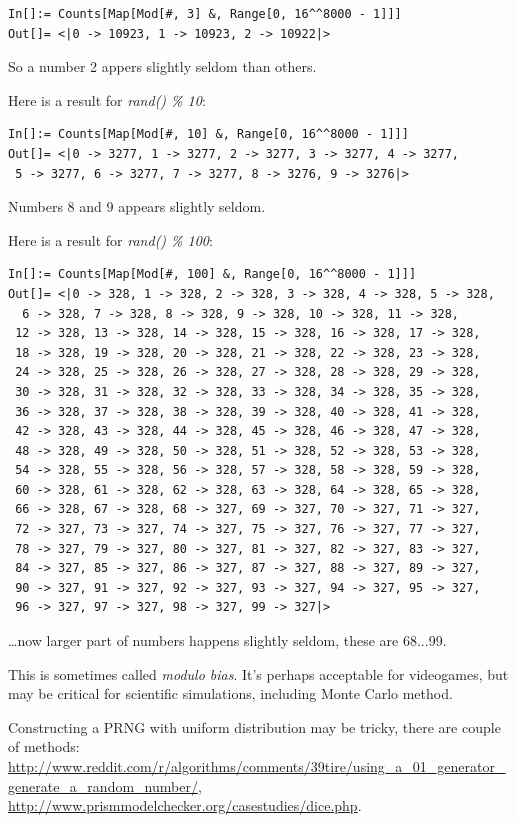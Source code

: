 \begin{lstlisting}
In[]:= Counts[Map[Mod[#, 3] &, Range[0, 16^^8000 - 1]]]
Out[]= <|0 -> 10923, 1 -> 10923, 2 -> 10922|>
\end{lstlisting}

So a number 2 appers slightly seldom than others.

Here is a result for \textit{rand() \% 10}:

\begin{lstlisting}
In[]:= Counts[Map[Mod[#, 10] &, Range[0, 16^^8000 - 1]]]
Out[]= <|0 -> 3277, 1 -> 3277, 2 -> 3277, 3 -> 3277, 4 -> 3277,
 5 -> 3277, 6 -> 3277, 7 -> 3277, 8 -> 3276, 9 -> 3276|>
\end{lstlisting}

Numbers 8 and 9 appears slightly seldom.

Here is a result for \textit{rand() \% 100}:

\begin{lstlisting}
In[]:= Counts[Map[Mod[#, 100] &, Range[0, 16^^8000 - 1]]]
Out[]= <|0 -> 328, 1 -> 328, 2 -> 328, 3 -> 328, 4 -> 328, 5 -> 328,
  6 -> 328, 7 -> 328, 8 -> 328, 9 -> 328, 10 -> 328, 11 -> 328,
 12 -> 328, 13 -> 328, 14 -> 328, 15 -> 328, 16 -> 328, 17 -> 328,
 18 -> 328, 19 -> 328, 20 -> 328, 21 -> 328, 22 -> 328, 23 -> 328,
 24 -> 328, 25 -> 328, 26 -> 328, 27 -> 328, 28 -> 328, 29 -> 328,
 30 -> 328, 31 -> 328, 32 -> 328, 33 -> 328, 34 -> 328, 35 -> 328,
 36 -> 328, 37 -> 328, 38 -> 328, 39 -> 328, 40 -> 328, 41 -> 328,
 42 -> 328, 43 -> 328, 44 -> 328, 45 -> 328, 46 -> 328, 47 -> 328,
 48 -> 328, 49 -> 328, 50 -> 328, 51 -> 328, 52 -> 328, 53 -> 328,
 54 -> 328, 55 -> 328, 56 -> 328, 57 -> 328, 58 -> 328, 59 -> 328,
 60 -> 328, 61 -> 328, 62 -> 328, 63 -> 328, 64 -> 328, 65 -> 328,
 66 -> 328, 67 -> 328, 68 -> 327, 69 -> 327, 70 -> 327, 71 -> 327,
 72 -> 327, 73 -> 327, 74 -> 327, 75 -> 327, 76 -> 327, 77 -> 327,
 78 -> 327, 79 -> 327, 80 -> 327, 81 -> 327, 82 -> 327, 83 -> 327,
 84 -> 327, 85 -> 327, 86 -> 327, 87 -> 327, 88 -> 327, 89 -> 327,
 90 -> 327, 91 -> 327, 92 -> 327, 93 -> 327, 94 -> 327, 95 -> 327,
 96 -> 327, 97 -> 327, 98 -> 327, 99 -> 327|>
\end{lstlisting}

\dots now larger part of numbers happens slightly seldom, these are 68...99.

This is sometimes called \textit{modulo bias}. It's perhaps acceptable for videogames, but may be critical for scientific simulations, including Monte Carlo method.

Constructing a \ac{PRNG} with uniform distribution may be tricky, there are couple of methods:\\
\url{http://www.reddit.com/r/algorithms/comments/39tire/using_a_01_generator_generate_a_random_number/},\\
\url{http://www.prismmodelchecker.org/casestudies/dice.php}.

\levelup{}

